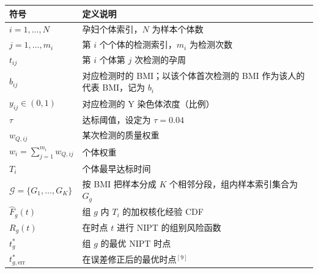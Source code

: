 %
%
\begin{table}[H]
    \centering
    \renewcommand{\arraystretch}{1.5}
    \begin{tabular}{@{}>{\centering\arraybackslash}m{}m{}@{}}
        \toprule
        符号 & 定义说明 \\
        \midrule
        $i = 1,\ldots,N$ & 孕妇个体索引，$N$ 为样本个体数 \\
        $j = 1,\ldots,m_i$ & 第 $i$ 个个体的检测索引，$m_i$ 为检测次数 \\
        $t_{ij}$ & 第 $i$ 个体第 $j$ 次检测的孕周 \\
        $b_{ij}$ & 对应检测时的 BMI；以该个体首次检测的 BMI 作为该人的代表 BMI，记为 $b_i$ \\
        $y_{ij} \in (0,1)$ & 对应检测的 Y 染色体浓度（比例） \\
        $\tau$ & 达标阈值，设定为 $\tau = 0.04$ \\
        $w_{Q,ij} $ &  某次检测的质量权重 \\
        $w_i = \sum_{j=1}^{m_i} w_{Q,ij}$ & 个体权重 \\
        $T_i$ & 个体最早达标时间 \\
        $\mathcal{G} = \{G_1,\ldots,G_K\}$ & 按 BMI 把样本分成 $K$ 个相邻分段，组内样本索引集合为 $G_g$ \\
        $\widehat{F}_g(t)$ & 组 $g$ 内 $T_i$ 的加权核化经验 CDF \\
        $R_g(t)$ & 在时点 $t$ 进行 NIPT 的组别风险函数 \\
        $t_g^*$ & 组 $g$ 的最优 NIPT 时点 \\
        $t_{g,\text{err}}^*$ & 在误差修正后的最优时点$^{[9]}$\\
        \bottomrule
    \end{tabular}
    \label{tab:variable_definitions}
\end{table}


